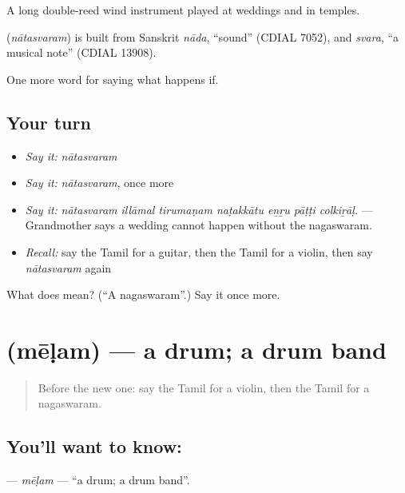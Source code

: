 A long double-reed wind instrument played at weddings and in temples.

\begin{cousinweb}
\textbf{} (\emph{nātasvaram}) is built from Sanskrit \emph{nāda}, \textquotedblleft{}sound\textquotedblright{} (CDIAL 7052), and \emph{svara}, \textquotedblleft{}a musical note\textquotedblright{} (CDIAL 13908).
\end{cousinweb}

\begin{grammarlens}[title={What you've built}]
One more word for saying what happens if.
\end{grammarlens}

\subsection*{Your turn}
\begin{itemize}
\raggedright
  \item \emph{Say it:} \emph{nātasvaram}
  \item \emph{Say it:} \emph{nātasvaram}, once more
  \item \emph{Say it:} \emph{nātasvaram illāmal tirumaṇam naṭakkātu eṉṟu pāṭṭi colkiṟāḷ.} — Grandmother says a wedding cannot happen without the nagaswaram.
  \item \emph{Recall:} say the Tamil for a guitar, then the Tamil for a violin, then say \emph{nātasvaram} again
\end{itemize}

\begin{tcolorbox}[breakable,colback=teal!4,colframe=teal!35!black,title={Before you move on}]
What does  mean? (\textquotedblleft{}A nagaswaram\textquotedblright{}.) Say it once more.
\end{tcolorbox}
\section[\texorpdfstring{\ta{மேளம்} (mēḷam)}{மேளம் (mēḷam)}]{ (mēḷam) — a drum; a drum band}

\label{lesson:TA-C558-melam}



\begin{quote}
Before the new one: say the Tamil for a violin, then the Tamil for a nagaswaram.
\end{quote}

\subsection*{You'll want to know: }
\textbf{} — \emph{mēḷam} — \textquotedblleft{}a drum; a drum band\textquotedblright{}.

